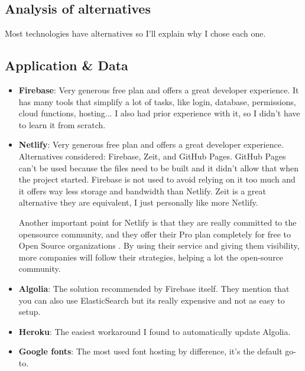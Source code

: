 \clearpage\newpage
\subsection{Analysis of alternatives}
Most technologies have alternatives so I'll explain why I chose each one.

\subsection*{Application \& Data}
\begin{itemize}
    \item \textbf{Firebase}: Very generous free plan and offers a great developer experience. It has many tools that simplify a lot of tasks, like login, database, permissions, cloud functions, hosting... I also had prior experience with it, so I didn't have to learn it from scratch. 
    \item \textbf{Netlify}: Very generous free plan and offers a great developer experience. Alternatives considered: Firebase, Zeit, and GitHub Pages. 
    GitHub Pages can't be used because the files need to be built and it didn't allow that when the project started. 
    Firebase is not used to avoid relying on it too much and it offers way less storage and bandwidth than Netlify. 
    Zeit is a great alternative they are equivalent, I just personally like more Netlify. 
    
    Another important point for Netlify is that they are really committed to the opensource community, and they offer their Pro plan completely for free to Open Source organizations \cite{netlify-opensource}. By using their service and giving them visibility, more companies will follow their strategies, helping a lot the open-source community.
    \item \textbf{Algolia}: The solution recommended by Firebase itself. They mention that you can also use ElasticSearch but its really expensive and not as easy to setup. \cite{algolia-why}
    \item \textbf{Heroku}: The easiest workaround I found to automatically update Algolia.
    \item \textbf{Google fonts}: The most used font hosting by difference, it's the default go-to.
\end{itemize}

